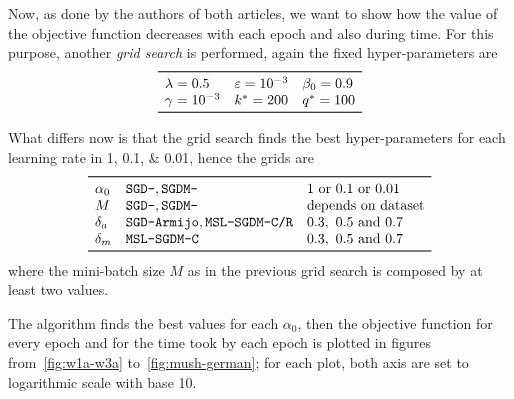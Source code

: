 Now, as done by the authors of both articles, we want to show how the value of the objective function decreases with each epoch and also during time. For this purpose, another \emph{grid search} is performed, again the fixed hyper-parameters are
\[
\begin{array}{lll}
\toprule
\lambda=0.5 & \epsilon=\num{e-3} & \beta_0=0.9 \\
\gamma=\num{e-3} & k^\ast=200 & q^\ast=100 \\
\bottomrule
\end{array}
\]

What differs now is that the grid search finds the best hyper-parameters for each learning rate in \numlist{1; 0.1; 0.01}, hence the grids are
\[
\begin{array}{lll}
\toprule
\alpha_0 & \text{\texttt{SGD-}}, \text{\texttt{SGDM-}} & \text{\numlist[list-separator={ or },list-final-separator={ or }]{1;0.1;0.01}} \\
M & \text{\texttt{SGD-}}, \text{\texttt{SGDM-}} & \text{depends on dataset} \\
\delta_a & \text{\texttt{SGD-Armijo}}, \text{\texttt{MSL-SGDM-C/R}} & \numlist{0.3;0.5;0.7} \\
\delta_m & \text{\texttt{MSL-SGDM-C}} & \numlist{0.3; 0.5; 0.7} \\
\bottomrule
\end{array}
\]
where the mini-batch size $M$ as in the previous grid search is composed by at least two values.

The algorithm finds the best values for each $\alpha_0$, then the objective function for every epoch and for the time took by each epoch is plotted in figures from~\vref{fig:w1a-w3a} to~\ref{fig:mush-german}; for each plot, both axis are set to logarithmic scale with base 10.

